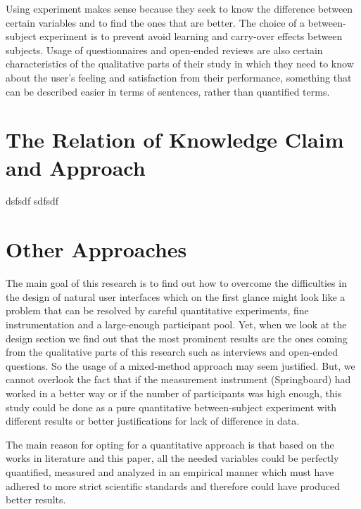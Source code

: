 \documentclass{sigchi}
\begin{document}
Using experiment makes sense because they seek to know the difference between certain variables and to find the ones that are better. The choice of a between-subject experiment is to prevent  avoid learning and carry-over effects between subjects. Usage of questionnaires and open-ended reviews are also certain characteristics of the qualitative parts of their study in which they need to know about the user's feeling and satisfaction from their performance, something that can be described easier in terms of sentences, rather than quantified terms.

\section{The Relation of Knowledge Claim and Approach}
dsfsdf sdfsdf

\section{Other Approaches}
The main goal of this research is to find out how to overcome the difficulties in the design of natural user interfaces which on the first glance might look like a problem that can be resolved by careful quantitative experiments, fine instrumentation and a large-enough participant pool. Yet, when we look at the design section we find out that the most prominent results are the ones coming from the qualitative parts of this research such as interviews and open-ended questions. So the usage of a mixed-method approach may seem justified. But, we cannot overlook the fact that if the measurement instrument (Springboard) had worked in a better way or if the number of participants was high enough, this study could be done as a pure quantitative between-subject experiment with different results or better justifications for lack of difference in data. 

The main reason for opting for a quantitative approach is that based on the works in literature and this paper, all the needed variables could be perfectly quantified, measured and analyzed in an empirical manner which must have adhered to more strict scientific standards and therefore could have produced better results. 

\balance{}



\end{document}
